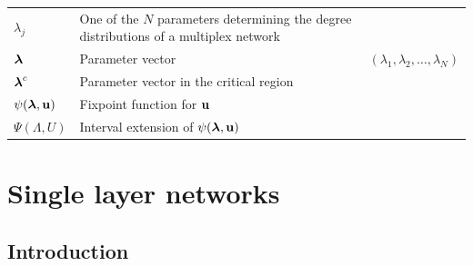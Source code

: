 \documentclass[
11pt, %
english, %
singlespacing, %
nolistspacing, %
liststotoc, %
headsepline, %
]{MastersDoctoralThesis} %
\begin{document}
\begin{longtable}{m{}m{}m{}}
\addlinespace
\addlinespace
\addlinespace

$\lambda_j$ 	& One of the $N$ parameters determining the degree distributions of a multiplex network \\
$\boldsymbol{\mathrm{\lambda}}$	& Parameter vector & $(\lambda_1, \lambda_2, \dots, \lambda_N)$ \\
$\boldsymbol{\mathrm{\lambda}}^c$	& Parameter vector in the critical region \\
$\psi(\boldsymbol{\mathrm{\lambda}}, \boldsymbol{\mathrm{u}})$	& Fixpoint function for $\boldsymbol{\mathrm{u}}$ \\
$\Psi(\Lambda, U)$			& Interval extension of $\psi(\boldsymbol{\mathrm{\lambda}}, \boldsymbol{\mathrm{u}})$ \\

\end{longtable}




\listoftodos

\mainmatter %

\pagestyle{thesis} %


\chapter{Single layer networks}
\label{Section: Single layer networks}

\section{Introduction}
\end{document}
